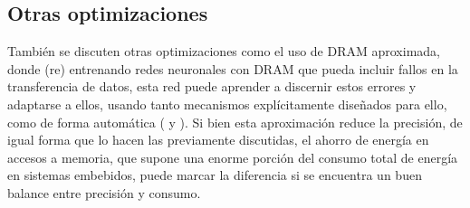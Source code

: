 \subsection{Otras optimizaciones}
\label{ssec:otras_optimizaciones}
También se discuten otras optimizaciones como el uso de DRAM aproximada, donde (re) entrenando redes neuronales con DRAM que pueda incluir fallos en la transferencia de datos, esta red puede aprender a discernir estos errores y adaptarse a ellos, usando tanto mecanismos explícitamente diseñados para ello, como de forma automática (\cite{koppula2019eden} y \cite{deep_learning_for_computer_architects}). Si bien esta aproximación reduce la precisión, de igual forma que lo hacen las previamente discutidas, el ahorro de energía en accesos a memoria, que supone una enorme porción del consumo total de energía en sistemas embebidos, puede marcar la diferencia si se encuentra un buen balance entre precisión y consumo.